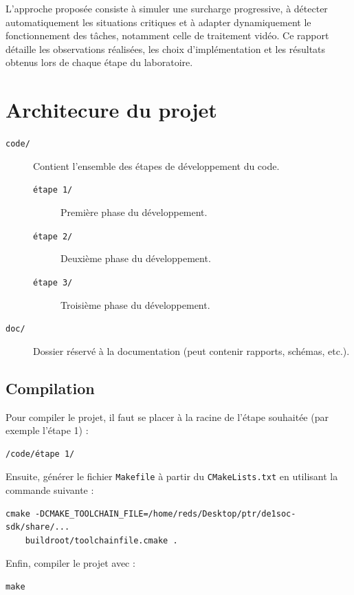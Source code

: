 \documentclass[a4paper,12pt]{article}
\begin{document}
L'approche proposée consiste à simuler une surcharge progressive, à détecter automatiquement les situations critiques et à adapter dynamiquement le fonctionnement des tâches, notamment celle de traitement vidéo. Ce rapport détaille les observations réalisées, les choix d'implémentation et les résultats obtenus lors de chaque étape du laboratoire.

\newpage

\section{Architecure du projet}

\begin{description}
  \item[\texttt{code/}] Contient l'ensemble des étapes de développement du code.
  \begin{description}
    \item[\texttt{étape 1/}] Première phase du développement.
    \item[\texttt{étape 2/}] Deuxième phase du développement.
    \item[\texttt{étape 3/}] Troisième phase du développement.
  \end{description}
  \item[\texttt{doc/}] Dossier réservé à la documentation (peut contenir rapports, schémas, etc.).
\end{description}

\subsection{Compilation}

Pour compiler le projet, il faut se placer à la racine de l'étape souhaitée (par exemple l'étape 1) :

\begin{verbatim}
/code/étape 1/
\end{verbatim}

Ensuite, générer le fichier \texttt{Makefile} à partir du \texttt{CMakeLists.txt} en utilisant la commande suivante :

\begin{verbatim}
cmake -DCMAKE_TOOLCHAIN_FILE=/home/reds/Desktop/ptr/de1soc-sdk/share/...
    buildroot/toolchainfile.cmake .
\end{verbatim}

Enfin, compiler le projet avec :

\begin{verbatim}
make
\end{verbatim}
\end{document}
